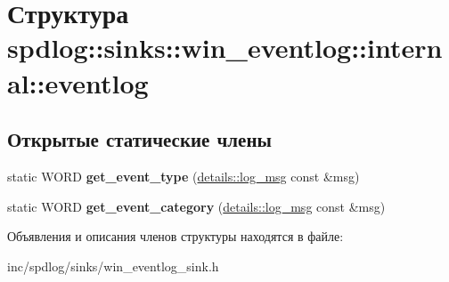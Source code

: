 \hypertarget{structspdlog_1_1sinks_1_1win__eventlog_1_1internal_1_1eventlog}{}\section{Структура spdlog\+:\+:sinks\+:\+:win\+\_\+eventlog\+:\+:internal\+:\+:eventlog}
\label{structspdlog_1_1sinks_1_1win__eventlog_1_1internal_1_1eventlog}
\subsection*{Открытые статические члены}
\begin{DoxyCompactItemize}
\item 
\mbox{\label{structspdlog_1_1sinks_1_1win__eventlog_1_1internal_1_1eventlog_a8c526dc4b16030ce533c69f134ed7989}} 
static W\+O\+RD {\bfseries get\+\_\+event\+\_\+type} (\hyperlink{structspdlog_1_1details_1_1log__msg}{details\+::log\+\_\+msg} const \&msg)
\item 
\mbox{\label{structspdlog_1_1sinks_1_1win__eventlog_1_1internal_1_1eventlog_a2d80cb3a91d48263b77f4c5c4f12e40f}} 
static W\+O\+RD {\bfseries get\+\_\+event\+\_\+category} (\hyperlink{structspdlog_1_1details_1_1log__msg}{details\+::log\+\_\+msg} const \&msg)
\end{DoxyCompactItemize}


Объявления и описания членов структуры находятся в файле\+:\begin{DoxyCompactItemize}
\item 
inc/spdlog/sinks/win\+\_\+eventlog\+\_\+sink.\+h\end{DoxyCompactItemize}
